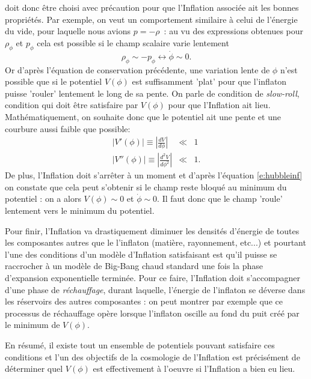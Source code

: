  doit donc être choisi avec précaution pour que l'Inflation associée ait les bonnes propriétés. Par exemple, on veut un comportement similaire à celui de l'énergie du vide, pour laquelle nous avions $p=-\rho$~: au vu des expressions obtenues pour $\rho_\phi$ et $p_\phi$ cela est possible si le champ scalaire varie lentement
\begin{equation}
\rho_\phi\sim -p_\phi \leftrightarrow \dot \phi \sim 0.
\end{equation}
Or d'après l'équation de conservation précédente, une variation lente de $\phi$ n'est possible que si le potentiel $V(\phi)$ est suffisamment 'plat' pour que l'inflaton puisse 'rouler' lentement le long de sa pente. On parle de condition de \textit{slow-roll}, condition qui doit être satisfaire par $V(\phi)$ pour que l'Inflation ait lieu. Mathématiquement, on souhaite donc que le potentiel ait une pente et une courbure aussi faible que possible:
\begin{eqnarray}
|V'(\phi)|\equiv|\frac{d V}{d\phi}| &\ll& 1\\
|V''(\phi)|\equiv|\frac{d ^2 V}{d\phi^2}| &\ll& 1.
\end{eqnarray}
De plus, l'Inflation doit s'arrêter à un moment et d'après l'équation \ref{e:hubbleinf} on constate que cela peut s'obtenir si le champ reste bloqué au minimum du potentiel : on a alors $V(\phi)\sim 0$ et $\dot \phi \sim 0$. Il faut donc que le champ 'roule' lentement vers le minimum du potentiel. 

Pour finir, l'Inflation va drastiquement diminuer les densités d'énergie de toutes les composantes autres que le l'inflaton (matière, rayonnement, etc...) et pourtant l'une des conditions d'un modèle d'Inflation satisfaisant est qu'il puisse se raccrocher à un modèle de Big-Bang chaud standard une fois la phase d'expansion exponentielle terminée. Pour ce faire, l'Inflation doit s'accompagner d'une phase de \textit{réchauffage}, durant laquelle, l'énergie de l'inflaton se déverse dans les réservoirs des autres composantes : on peut montrer par exemple que ce processus de réchauffage opère lorsque l'inflaton oscille au fond du puit créé par le minimum de $V(\phi)$.


En résumé, il existe tout un ensemble de potentiels pouvant satisfaire ces conditions et l'un des objectifs de la cosmologie de l'Inflation est précisément de déterminer quel $V(\phi)$ est effectivement à l'oeuvre si l'Inflation a bien eu lieu.



